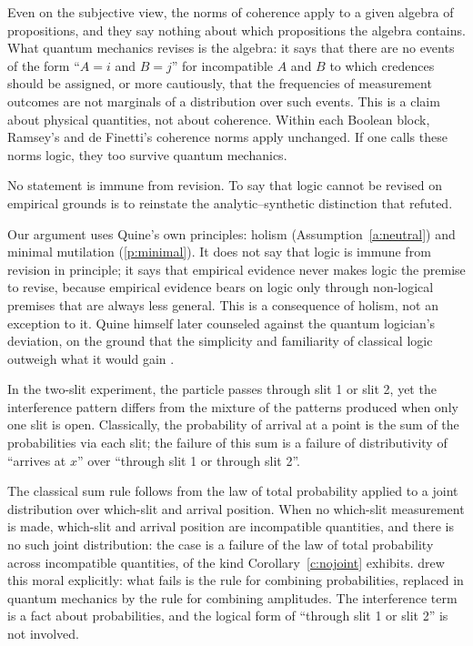 \documentclass{situationist-preprint}
\begin{document}
\begin{reply}
Even on the subjective view, the norms of coherence apply to a given algebra of propositions, and they say nothing about which propositions the algebra contains. What quantum mechanics revises is the algebra: it says that there are no events of the form \enquote{$A = i$ and $B = j$} for incompatible $A$ and $B$ to which credences should be assigned, or more cautiously, that the frequencies of measurement outcomes are not marginals of a distribution over such events. This is a claim about physical quantities, not about coherence. Within each Boolean block, Ramsey's and de Finetti's coherence norms apply unchanged. If one calls these norms logic, they too survive quantum mechanics.
\end{reply}

\begin{objection}[Quine]
No statement is immune from revision. To say that logic cannot be revised on empirical grounds is to reinstate the analytic--synthetic distinction that \citet{Quine1951} refuted.
\end{objection}

\begin{reply}
Our argument uses Quine's own principles: holism (Assumption~\ref{a:neutral}) and minimal mutilation (\ref{p:minimal}). It does not say that logic is immune from revision in principle; it says that empirical evidence never makes logic the premise to revise, because empirical evidence bears on logic only through non-logical premises that are always less general. This is a consequence of holism, not an exception to it. Quine himself later counseled against the quantum logician's deviation, on the ground that the simplicity and familiarity of classical logic outweigh what it would gain \citep{Quine1970}.
\end{reply}

\begin{objection}
In the two-slit experiment, the particle passes through slit 1 or slit 2, yet the interference pattern differs from the mixture of the patterns produced when only one slit is open. Classically, the probability of arrival at a point is the sum of the probabilities via each slit; the failure of this sum is a failure of distributivity of \enquote{arrives at $x$} over \enquote{through slit 1 or through slit 2}.
\end{objection}

\begin{reply}
The classical sum rule follows from the law of total probability applied to a joint distribution over which-slit and arrival position. When no which-slit measurement is made, which-slit and arrival position are incompatible quantities, and there is no such joint distribution: the case is a failure of the law of total probability across incompatible quantities, of the kind Corollary~\ref{c:nojoint} exhibits. \citet{Feynman1951} drew this moral explicitly: what fails is the rule for combining probabilities, replaced in quantum mechanics by the rule for combining amplitudes. The interference term is a fact about probabilities, and the logical form of \enquote{through slit 1 or slit 2} is not involved.
\end{reply}
\end{document}
